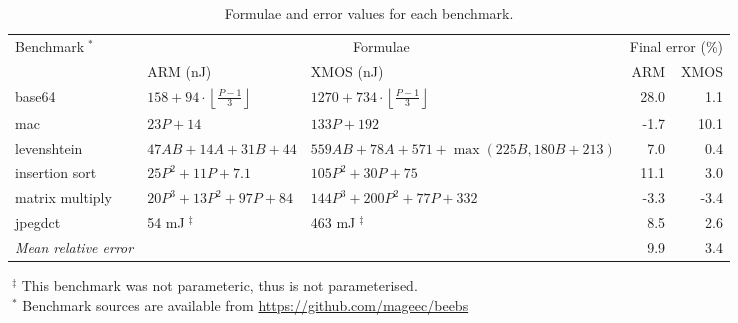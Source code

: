 \documentclass[9pt,preprint]{sigplanconf}
\begin{document}
\begin{table*}
  \centering
  \begin{tabular}{lllrr}
  \toprule
  Benchmark\hspace{-1mm}$\phantom.^*$ & \multicolumn{2}{c}{Formulae} & \multicolumn{2}{c}{Final error (\%)} \\
                  & ARM (nJ) &XMOS (nJ) &  ARM & XMOS \\
  \midrule
  base64          & $158 + 94 \cdot \left\lfloor \frac{P-1}{3} \right\rfloor$ & $1270 + 734 \cdot \left\lfloor \frac{P-1}{3} \right\rfloor$   & 28.0                                    & 1.1                                   \\
  mac             & $23P + 14$                                                & $133 P+192$                                                   & -1.7                                    & 10.1                                  \\
  levenshtein     & $47AB+14A+31B+44$                                         &
  $559AB + 78A+571 + \max(225B,180B+213)$                         & 7.0                                     & 0.4                                   \\
  insertion sort  & $25P^2 + 11P + 7.1$                                       & $105 P^2+30 P+75$                                             & 11.1                                    & 3.0                                   \\
  matrix multiply & $20P^3 + 13P^2 + 97P + 84$                                & $144 P^3+200 P^2+77 P+332$                                    & -3.3                                    & -3.4                                  \\
  jpegdct         & 54 mJ\hspace{-1mm}$\phantom .^\ddagger$                   & 463 mJ\hspace{-1mm}$\phantom .^\ddagger$                     & 8.5                                     & 2.6                                   \\
  \midrule
  \textit{Mean relative error} & && 9.9 & 3.4 \\
  \bottomrule
  \end{tabular}
  \nocaptionrule
  \caption{Formulae and error values for each benchmark.}
  \vspace{2mm}
  $\phantom .^\ddagger$ This benchmark was not parameteric, thus is not parameterised. \\
  \raggedleft \small\hspace{-1mm}$\phantom .^*$ Benchmark sources are available
  from \url{https://github.com/mageec/beebs}\\
  \label{tab:table_results}
  \vspace{-1em}
\end{table*}
\end{document}
